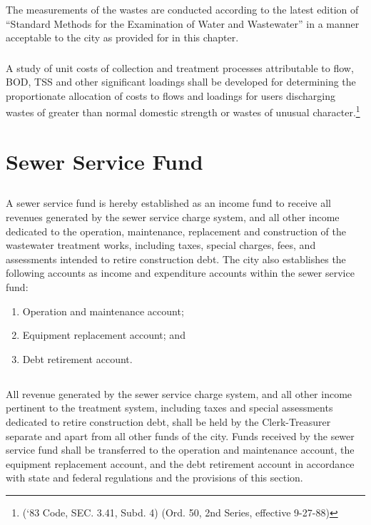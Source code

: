 \subsubsection{}
The measurements of the wastes are conducted according to the latest edition of “Standard Methods for the Examination of Water and Wastewater” in a manner acceptable to the city as provided for in this chapter.
\subsubsection{}
A study of unit costs of collection and treatment processes attributable to flow, BOD, TSS and other significant loadings shall be developed for determining the proportionate allocation of costs to flows and loadings for users discharging wastes of greater than normal domestic strength or wastes of unusual character.\footnote{(‘83 Code, SEC. 3.41, Subd. 4) (Ord. 50, 2nd Series, effective 9-27-88)}

\section{Sewer Service Fund}
\subsection{}
A sewer service fund is hereby established as an income fund to receive all revenues generated by the sewer service charge system, and all other income dedicated to the operation, maintenance, replacement and construction of the wastewater treatment works, including taxes, special charges, fees, and assessments intended to retire construction debt.  The city also establishes the following accounts as income and expenditure accounts within the sewer service fund:
\begin{enumerate}
\item Operation and maintenance account;
\item Equipment replacement account; and
\item Debt retirement account.
\end{enumerate}
\subsection{}
All revenue generated by the sewer service charge system, and all other income pertinent to the treatment system, including taxes and special assessments dedicated to retire construction debt, shall be held by the Clerk-Treasurer separate and apart from all other funds of the city.  Funds received by the sewer service fund shall be transferred to the operation and maintenance account, the equipment replacement account, and the debt retirement account in accordance with state and federal regulations and the provisions of this section.
